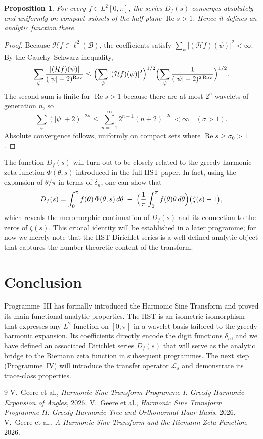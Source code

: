\documentclass[11pt,a4paper]{article}
\newtheorem{proposition}[theorem]{Proposition}
\begin{document}
\begin{proposition}\label{prop:conv}
For every \(f\in L^2[0,\pi]\), the series \(D_f(s)\) converges absolutely and uniformly on compact subsets of the half‑plane \(\operatorname{Re}s>1\).  Hence it defines an analytic function there.
\end{proposition}
\begin{proof}
Because \(\mathcal{H}f\in\ell^2(\mathcal{B})\), the coefficients satisfy \(\sum_\psi |(\mathcal{H}f)(\psi)|^2 < \infty\).  By the Cauchy–Schwarz inequality,
\[
\sum_{\psi} \frac{|(\mathcal{H}f)(\psi)|}{(|\psi|+2)^{\operatorname{Re}s}}
\le \Bigl(\sum_\psi |(\mathcal{H}f)(\psi)|^2\Bigr)^{1/2}
\Bigl(\sum_\psi \frac{1}{(|\psi|+2)^{2\operatorname{Re}s}}\Bigr)^{1/2}.
\]
The second sum is finite for \(\operatorname{Re}s>1\) because there are at most \(2^n\) wavelets of generation \(n\), so
\[
\sum_{\psi} (|\psi|+2)^{-2\sigma} \le \sum_{n=-1}^\infty 2^{n+1} (n+2)^{-2\sigma} < \infty \quad (\sigma>1).
\]
Absolute convergence follows, uniformly on compact sets where \(\operatorname{Re}s\ge \sigma_0>1\).
\end{proof}

The function \(D_f(s)\) will turn out to be closely related to the greedy harmonic zeta function \(\Phi(\theta,s)\) introduced in the full HST paper.  In fact, using the expansion of \(\theta/\pi\) in terms of \(\delta_n\), one can show that
\[
D_f(s) = \int_0^\pi f(\theta)\,\Phi(\theta,s)\,d\theta \;-\; \Bigl(\frac{1}{\pi}\int_0^\pi f(\theta)\theta\,d\theta\Bigr)\bigl(\zeta(s)-1\bigr),
\]
which reveals the meromorphic continuation of \(D_f(s)\) and its connection to the zeros of \(\zeta(s)\).  This crucial identity will be established in a later programme; for now we merely note that the HST Dirichlet series is a well‑defined analytic object that captures the number‑theoretic content of the transform.

\section{Conclusion}
Programme~III has formally introduced the Harmonic Sine Transform and proved its main functional‑analytic properties.  The HST is an isometric isomorphism that expresses any \(L^2\) function on \([0,\pi]\) in a wavelet basis tailored to the greedy harmonic expansion.  Its coefficients directly encode the digit functions \(\delta_n\), and we have defined an associated Dirichlet series \(D_f(s)\) that will serve as the analytic bridge to the Riemann zeta function in subsequent programmes.  The next step (Programme~IV) will introduce the transfer operator \(\mathcal{L}_s\) and demonstrate its trace‑class properties.

\begin{thebibliography}{9}
V.~Geere et al., \emph{Harmonic Sine Transform Programme I: Greedy Harmonic Expansion of Angles}, 2026.
V.~Geere et al., \emph{Harmonic Sine Transform Programme II: Greedy Harmonic Tree and Orthonormal Haar Basis}, 2026.
V.~Geere et al., \emph{A Harmonic Sine Transform and the Riemann Zeta Function}, 2026.
\end{thebibliography}
\end{document}
